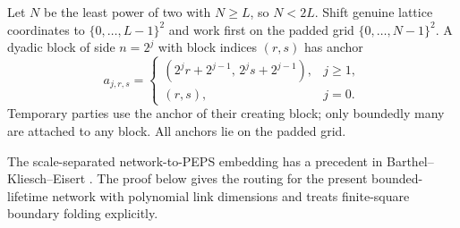 Let $N$ be the least power of two with $N\ge L$, so $N<2L$.
Shift genuine lattice coordinates to $\{0,\ldots,L-1\}^2$ and work first
on the padded grid $\{0,\ldots,N-1\}^2$. A dyadic block of side $n=2^j$
with block indices $(r,s)$ has anchor
\begin{equation}\label{eq:anchors}
 a_{j,r,s}=\begin{cases}
 (2^jr+2^{j-1},\,2^js+2^{j-1}),&j\ge1,\\
 (r,s),&j=0.
 \end{cases}
\end{equation}
Temporary parties use the anchor of their creating block; only boundedly
many are attached to any block. All anchors lie on the padded grid.

The scale-separated network-to-PEPS embedding has a precedent in
Barthel--Kliesch--Eisert \cite[Section~III.C, Eqs.~(7)--(12)]{BarthelKlieschEisert2010}.
The proof below gives the routing for the present bounded-lifetime
network with polynomial link dimensions and treats finite-square
boundary folding explicitly.

